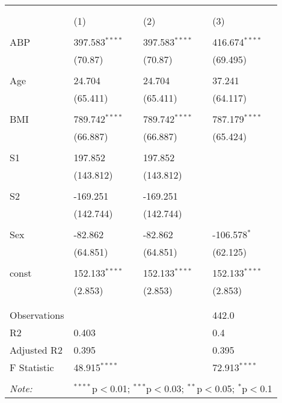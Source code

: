 \begin{table}[!htbp] \centering
  \label{}
\begin{tabularx}{\textwidth}{lXXX}
\\[-1.8ex]\hline
\hline \\[-1.8ex]
&\multicolumn{3}{c}{\textit{}} \
\cr \cline{4-4}
\\[-1.8ex]& (1) & (2) & (3) \\
\hline \\[-1.8ex]
 ABP & 397.583$^{****}$ & 397.583$^{****}$ & 416.674$^{****}$ \\
&(70.87)&(70.87)&(69.495)\\
  & & & \\
 Age & 24.704$^{}$ & 24.704$^{}$ & 37.241$^{}$ \\
&(65.411)&(65.411)&(64.117)\\
  & & & \\
 BMI & 789.742$^{****}$ & 789.742$^{****}$ & 787.179$^{****}$ \\
&(66.887)&(66.887)&(65.424)\\
  & & & \\
 S1 & 197.852$^{}$ & 197.852$^{}$ & \\
&(143.812)&(143.812)& \\
  & & & \\
 S2 & -169.251$^{}$ & -169.251$^{}$ & \\
&(142.744)&(142.744)& \\
  & & & \\
 Sex & -82.862$^{}$ & -82.862$^{}$ & -106.578$^{*}$ \\
&(64.851)&(64.851)&(62.125)\\
  & & & \\
 const & 152.133$^{****}$ & 152.133$^{****}$ & 152.133$^{****}$ \\
&(2.853)&(2.853)&(2.853)\\
  & & & \\
\hline \\[-1.8ex]
 Observations\quad &   &   & 442.0 \\
 R${2}$\quad & 0.403 &   & 0.4 \\
 Adjusted R${2}$\quad & 0.395 &   & 0.395 \\
 F Statistic\quad & 48.915$^{****}$  &     & 72.913$^{****}$  \\
\hline
\hline \\[-1.8ex]
\textit{Note:} & \multicolumn{3}{r}{$^{****}$p$<$0.01; $^{***}$p$<$0.03; $^{**}$p$<$0.05; $^{*}$p$<$0.1} \\
\end{tabularx}
\end{table}
